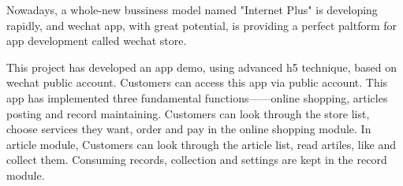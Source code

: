 
\begin{englishabstract}%
  Nowadays, a whole-new bussiness model named "Internet Plus" is developing rapidly, and wechat app, with great potential, is providing a perfect paltform for app development called wechat store.
  \par
  This project has developed an app demo, using advanced h5 technique, based on wechat public account. Customers can access this app via public account. This app has implemented three fundamental functions——online shopping, articles posting and record maintaining. Customers can look through the store list, choose services they want, order and pay in the online shopping module. In article module, Customers can look through the article list, read artiles, like and collect them. Consuming records, collection and settings are kept in the record module.\\
\end{englishabstract}
